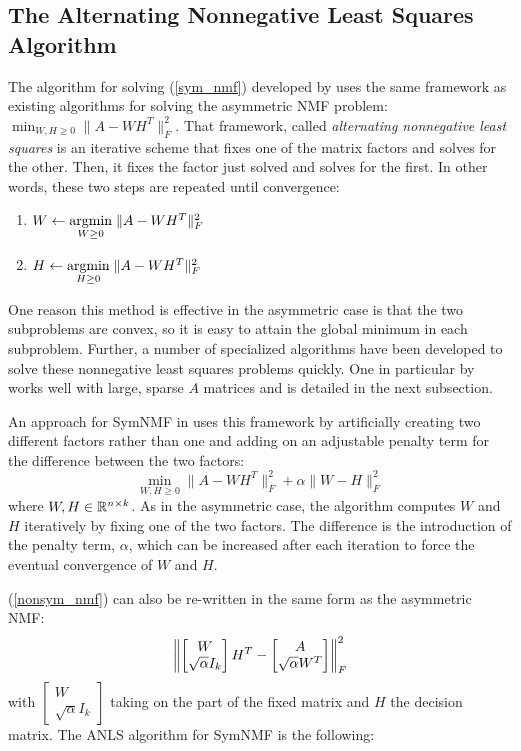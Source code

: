 \subsection{The Alternating Nonnegative Least Squares Algorithm}

The algorithm for solving (\ref{sym_nmf}) developed by \cite{Kuang:15}
uses the same framework as existing algorithms for solving the
asymmetric NMF problem: $\min_{W,H \geq 0} \|A - W H^T\|_F^2$.
That framework, called \textit{alternating nonnegative least squares}
is an iterative scheme that fixes one of the matrix factors and
solves for the other. Then, it fixes the factor just solved and
solves for the first. In other words, these two steps are repeated
until convergence:
\begin{enumerate}
  \item $ W \gets \underset{W \geq 0}{\mathrm{arg min}}\; \|A - W H^T\|_F^2 $
  \item $ H \gets \underset{H \geq 0}{\mathrm{arg min}}\; \|A - W H^T\|_F^2 $
\end{enumerate}
One reason this method is effective in the asymmetric case is
that the two subproblems are convex, so it is easy to attain the
global minimum in each subproblem. Further, a number of specialized
algorithms have been developed to solve these nonnegative least
squares problems quickly. One in particular by \cite{Kim:11} works
well with large, sparse $A$ matrices and is detailed in the next
subsection.

An approach for SymNMF in \cite{Kuang:15} uses this framework by
artificially creating two different factors rather than one
and adding on an adjustable penalty term for the difference
between the two factors:
\begin{equation} \label{nonsym_nmf}
\min_{W,H \geq 0} \|A - W H^T\|_F^2 + \alpha \|W - H\|_F^2
\end{equation}
where $W,H \in \mathbb{R}^{n \times k}$. As in the asymmetric case, the
algorithm computes $W$ and $H$ iteratively by fixing one of the
two factors. The difference is the introduction of the penalty
term, $\alpha$, which can be increased after each iteration to
force the eventual convergence of $W$ and $H$.

(\ref{nonsym_nmf}) can also be re-written in the same form as the
asymmetric NMF:
\begin{equation} \label{nls}
\left\lVert \begin{bmatrix} W \\ \sqrt{\alpha} I_k \end{bmatrix} H^T
     - \begin{bmatrix} A \\ \sqrt{\alpha} W^T \end{bmatrix} \right\rVert_F^2
\end{equation}
with $\begin{bmatrix} W \\ \sqrt{\alpha} I_k \end{bmatrix}$ taking on
the part of the fixed matrix and $H$ the decision matrix.
The ANLS algorithm for SymNMF is the following:

